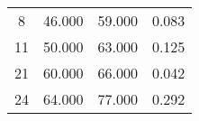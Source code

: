 % 
\begin{tabular}{cccc}
  \hline
  \hline
8 & 46.000 & 59.000 & 0.083 \\ 
  11 & 50.000 & 63.000 & 0.125 \\ 
  21 & 60.000 & 66.000 & 0.042 \\ 
  24 & 64.000 & 77.000 & 0.292 \\ 
   \hline
\end{tabular}
